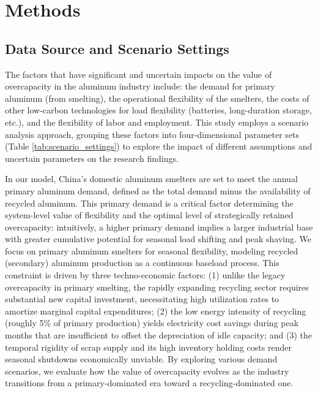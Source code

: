 \documentclass[preprint]{elsarticle}
\begin{document}
\section*{\textbf{Methods}}

\subsection*{Data Source and Scenario Settings}\label{sec:data_source_and_scenario_settings}

The factors that have significant and uncertain impacts on the value of overcapacity in the aluminum industry include: the demand for primary aluminum (from smelting), the operational flexibility of the smelters, the costs of other low-carbon technologies for load flexibility (batteries, long-duration storage, etc.), and the flexibility of labor and employment. This study employs a scenario analysis approach, grouping these factors into four-dimensional parameter sets (Table \ref{tab:scenario_settings}) to explore the impact of different assumptions and uncertain parameters on the research findings.

In our model, China's domestic aluminum smelters are set to meet the annual primary aluminum demand, defined as the total demand minus the availability of recycled aluminum. This primary demand is a critical factor determining the system-level value of flexibility and the optimal level of strategically retained overcapacity: intuitively, a higher primary demand implies a larger industrial base with greater cumulative potential for seasonal load shifting and peak shaving. We focus on primary aluminum smelters for seasonal flexibility, modeling recycled (secondary) aluminum production as a continuous baseload process. This constraint is driven by three techno-economic factors: (1) unlike the legacy overcapacity in primary smelting, the rapidly expanding recycling sector requires substantial new capital investment, necessitating high utilization rates to amortize marginal capital expenditures; (2) the low energy intensity of recycling (roughly 5\% of primary production) yields electricity cost savings during peak months that are insufficient to offset the depreciation of idle capacity; and (3) the temporal rigidity of scrap supply and its high inventory holding costs render seasonal shutdowns economically unviable. By exploring various demand scenarios, we evaluate how the value of overcapacity evolves as the industry transitions from a primary-dominated era toward a recycling-dominated one.
\end{document}
